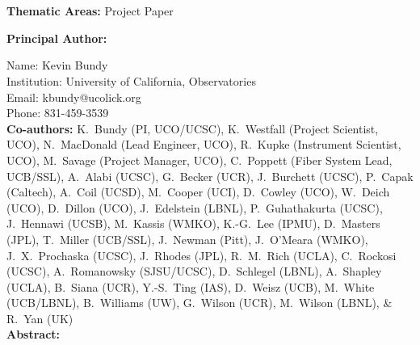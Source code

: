 \documentclass[oneside,12pt]{amsart}
\begin{document}
 \\[20pt]
\\

\noindent \textbf{Thematic Areas:} Project Paper
  
\noindent \textbf{Principal Author:}

\noindent Name:	Kevin Bundy \\
\noindent Institution:  University of California, Observatories \\
\noindent Email:  kbundy@ucolick.org \\
\noindent Phone:  831-459-3539 \\
 
\noindent \textbf{Co-authors:} {\footnotesize K.~Bundy (PI, UCO/UCSC), K.~Westfall (Project
Scientist, UCO), N.~MacDonald (Lead Engineer, UCO), R.~Kupke
(Instrument Scientist, UCO), M.~Savage (Project Manager, UCO),
C.~Poppett (Fiber System Lead, UCB/SSL), A.~Alabi (UCSC), G.~Becker
(UCR), J.~Burchett (UCSC), P.~Capak (Caltech), A.~Coil (UCSD),
M.~Cooper (UCI), D.~Cowley (UCO), W.~Deich (UCO), D.~Dillon (UCO),
J.~Edelstein (LBNL), P.~Guhathakurta (UCSC), J.~Hennawi (UCSB), M.~Kassis (WMKO),
K.-G.~Lee (IPMU), D.~Masters (JPL), T.~Miller (UCB/SSL), J.~Newman
(Pitt), J.~O'Meara (WMKO), J.~X.~Prochaska (UCSC), J.~Rhodes (JPL), R.~M.~Rich (UCLA),
C.~Rockosi (UCSC), A.~Romanowsky (SJSU/UCSC), D.~Schlegel (LBNL),
A.~Shapley (UCLA), B.~Siana (UCR), Y.-S.~Ting (IAS), D.~Weisz
(UCB), M.~White (UCB/LBNL), B.~Williams (UW), G.~Wilson (UCR),
M.~Wilson (LBNL), \& R.~Yan (UK)} \\

\noindent \textbf{Abstract:} 
\end{document}
